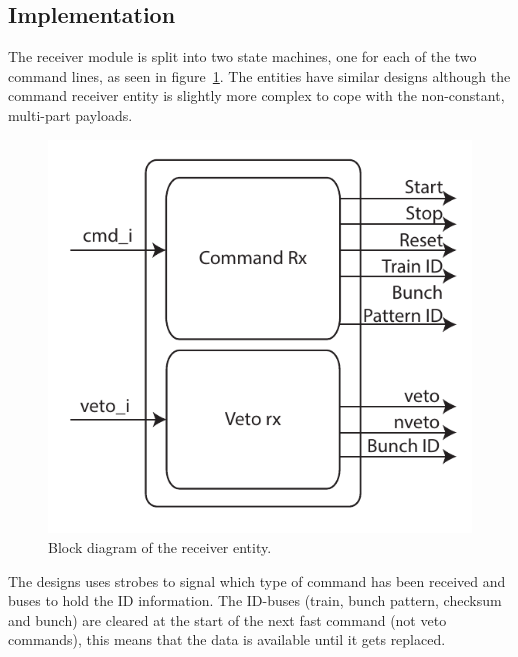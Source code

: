 \subsection{Implementation} %
\label{sub:rx_implementation}
The receiver module is split into two state machines, one for each of the two command lines, as seen in figure~\ref{fig:rx_entity}. The entities have similar designs although the command receiver entity is slightly more complex to cope with the non-constant, multi-part payloads. 
\begin{figure}[htbp] 
  \centering
  \includegraphics[scale=1]{images/pdfs/rx_block.pdf}
  \caption{Block diagram of the receiver entity.}
  \label{fig:rx_entity}
\end{figure}
  
The designs uses strobes to signal which type of command has been received and buses to hold the ID information. The ID-buses (train, bunch pattern, checksum and bunch) are cleared at the start of the next fast command (not veto commands), this means that the data is available until it gets replaced.
  

